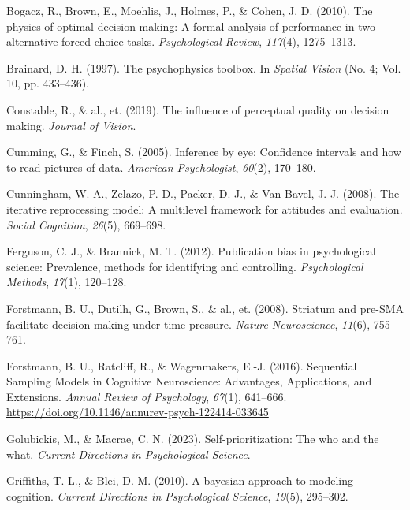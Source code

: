 \documentclass[
  english,
  man,floatsintext]{apa6}
\newlength{\cslhangindent}
\newenvironment{CSLReferences}[2] %
 {\begin{list}{}{%
  \setlength{\itemindent}{0pt}
  \setlength{\leftmargin}{0pt}
  \setlength{\parsep}{0pt}
  \ifodd #1
   \setlength{\leftmargin}{\cslhangindent}
   \setlength{\itemindent}{-1\cslhangindent}
  \fi
  \setlength{\itemsep}{#2\baselineskip}}}
 {\end{list}}
\begin{document}
\label{refs}
\begin{CSLReferences}{1}{0}
Bogacz, R., Brown, E., Moehlis, J., Holmes, P., \& Cohen, J. D. (2010). The physics of optimal decision making: A formal analysis of performance in two-alternative forced choice tasks. \emph{Psychological Review}, \emph{117}(4), 1275--1313.

Brainard, D. H. (1997). The psychophysics toolbox. In \emph{Spatial Vision} (No. 4; Vol. 10, pp. 433--436).

Constable, R., \& al., et. (2019). The influence of perceptual quality on decision making. \emph{Journal of Vision}.

Cumming, G., \& Finch, S. (2005). Inference by eye: Confidence intervals and how to read pictures of data. \emph{American Psychologist}, \emph{60}(2), 170--180.

Cunningham, W. A., Zelazo, P. D., Packer, D. J., \& Van Bavel, J. J. (2008). The iterative reprocessing model: A multilevel framework for attitudes and evaluation. \emph{Social Cognition}, \emph{26}(5), 669--698.

Ferguson, C. J., \& Brannick, M. T. (2012). Publication bias in psychological science: Prevalence, methods for identifying and controlling. \emph{Psychological Methods}, \emph{17}(1), 120--128.

Forstmann, B. U., Dutilh, G., Brown, S., \& al., et. (2008). Striatum and pre-SMA facilitate decision-making under time pressure. \emph{Nature Neuroscience}, \emph{11}(6), 755--761.

Forstmann, B. U., Ratcliff, R., \& Wagenmakers, E.-J. (2016). Sequential {Sampling} {Models} in {Cognitive} {Neuroscience}: {Advantages}, {Applications}, and {Extensions}. \emph{Annual Review of Psychology}, \emph{67}(1), 641--666. \url{https://doi.org/10.1146/annurev-psych-122414-033645}

Golubickis, M., \& Macrae, C. N. (2023). Self-prioritization: The who and the what. \emph{Current Directions in Psychological Science}.

Griffiths, T. L., \& Blei, D. M. (2010). A bayesian approach to modeling cognition. \emph{Current Directions in Psychological Science}, \emph{19}(5), 295--302.


\end{CSLReferences}
\end{document}
